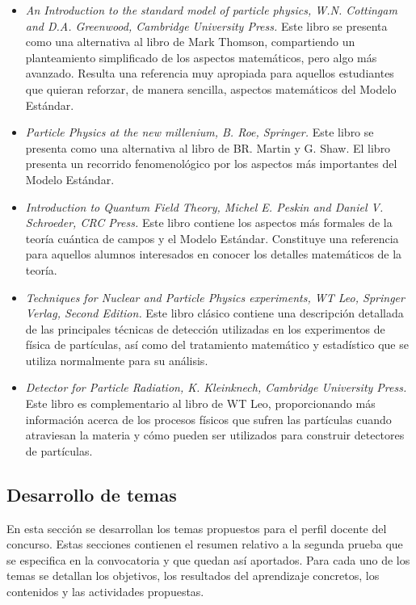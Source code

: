 \begin{itemize}
    \item \emph{An Introduction to the standard model of particle physics, W.N. Cottingam and D.A. Greenwood, Cambridge University Press.} Este libro se presenta como una alternativa al libro de Mark Thomson, compartiendo un planteamiento simplificado de los aspectos matemáticos, pero algo más avanzado. Resulta una referencia muy apropiada para aquellos estudiantes que quieran reforzar, de manera sencilla, aspectos matemáticos del Modelo Estándar.
    \item \emph {Particle Physics at the new millenium, B. Roe, Springer.} Este libro se presenta como una alternativa al libro de BR. Martin y G. Shaw. El libro presenta un recorrido fenomenológico por los aspectos más importantes del Modelo Estándar.
    \item \emph{Introduction to Quantum Field Theory, Michel E. Peskin and Daniel V. Schroeder, CRC Press.} Este libro contiene los aspectos más formales de la teoría cuántica de campos y el Modelo Estándar. Constituye una referencia para aquellos alumnos interesados en conocer los detalles matemáticos de la teoría. 
    \item \emph{Techniques for Nuclear and Particle Physics experiments, WT Leo, Springer Verlag, Second Edition.} Este libro clásico contiene una descripción detallada de las principales técnicas de detección utilizadas en los experimentos de física de partículas, así como del tratamiento matemático y estadístico que se utiliza normalmente para su análisis. 
    \item \emph{Detector for Particle Radiation, K. Kleinknech, Cambridge University Press.} Este libro es complementario al libro de WT Leo, proporcionando más información acerca de los procesos físicos que sufren las partículas cuando atraviesan la materia y cómo pueden ser utilizados para construir detectores de partículas.
\end{itemize}


\subsection{Desarrollo de temas}\label{desarrollotemas}

En esta sección se desarrollan los temas propuestos para el perfil docente del concurso. Estas secciones contienen el resumen relativo a la segunda prueba que se especifica en la convocatoria y que quedan así aportados. Para cada uno de los temas se detallan los objetivos, los resultados del aprendizaje concretos, los contenidos y las actividades propuestas. 


